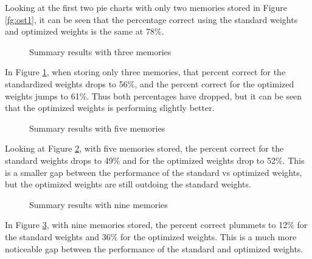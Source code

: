 Looking at the first two pie charts with only two memories stored in Figure \ref{fg:ost1}, it can be seen that the percentage correct using the standard weights and optimized weights is the same at 78\%.\\

\begin{figure}[h]
	\centering
	\caption{Summary results with three memories}
	\label{fg:ost2}
\end{figure}

In Figure \ref{fg:ost2}, when storing only three memories, that percent correct for the standardized weights drops to 56\%, and the percent correct for the optimized weights jumps to 61\%. Thus both percentages have dropped, but it can be seen that the optimized weights is performing slightly better.\\

\begin{figure}[h]
	\centering
	\caption{Summary results with five memories}
	\label{fg:ost3}
\end{figure}

Looking at Figure \ref{fg:ost3}, with five memories stored, the percent correct for the standard weights drops to 49\% and for the optimized weights drop to 52\%. This is a smaller gap between the performance of the standard vs optimized weights, but the optimized weights are still outdoing the standard weights.\\

\begin{figure}[h]
	\centering
	\caption{Summary results with nine memories}
	\label{fg:ost4}
\end{figure}

In Figure \ref{fg:ost4}, with nine memories stored, the percent correct plummets to 12\% for the standard weights and 36\% for the optimized weights. This is a much more noticeable gap between the performance of the standard and optimized weights.\\


